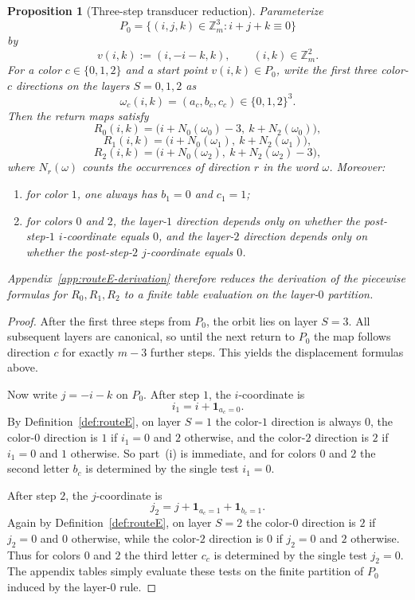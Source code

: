\documentclass[11pt]{article}
\newtheorem{proposition}{Proposition}
\begin{document}
\begin{proposition}[Three-step transducer reduction]\label{prop:routeE-transducer}
Parameterize
\[
P_0=\{(i,j,k)\in \mathbb Z_m^3:i+j+k\equiv 0\}
\]
by
\[
v(i,k):=(i,-i-k,k),\qquad (i,k)\in \mathbb Z_m^2.
\]
For a color $c\in\{0,1,2\}$ and a start point $v(i,k)\in P_0$, write the first three color-$c$ directions on the layers $S=0,1,2$ as
\[
\omega_c(i,k)=(a_c,b_c,c_c)\in\{0,1,2\}^3.
\]
Then the return maps satisfy
\[
R_0(i,k)=\bigl(i+N_0(\omega_0)-3,\ k+N_2(\omega_0)\bigr),
\]
\[
R_1(i,k)=\bigl(i+N_0(\omega_1),\ k+N_2(\omega_1)\bigr),
\]
\[
R_2(i,k)=\bigl(i+N_0(\omega_2),\ k+N_2(\omega_2)-3\bigr),
\]
where $N_r(\omega)$ counts the occurrences of direction $r$ in the word $\omega$.
Moreover:
\begin{enumerate}[label=\textup{(\roman*)},leftmargin=2.5em]
\item for color $1$, one always has $b_1=0$ and $c_1=1$;
\item for colors $0$ and $2$, the layer-$1$ direction depends only on whether the post-step-$1$ $i$-coordinate equals $0$, and the layer-$2$ direction depends only on whether the post-step-$2$ $j$-coordinate equals $0$.
\end{enumerate}
Appendix~\ref{app:routeE-derivation} therefore reduces the derivation of the piecewise formulas for $R_0,R_1,R_2$ to a finite table evaluation on the layer-$0$ partition.
\end{proposition}

\begin{proof}
After the first three steps from $P_0$, the orbit lies on layer $S=3$.
All subsequent layers are canonical, so until the next return to $P_0$ the map follows direction $c$ for exactly $m-3$ further steps.
This yields the displacement formulas above.

Now write $j=-i-k$ on $P_0$.
After step $1$, the $i$-coordinate is
\[
i_1=i+\mathbf 1_{a_c=0}.
\]
By Definition~\ref{def:routeE}, on layer $S=1$ the color-$1$ direction is always $0$, the color-$0$ direction is $1$ if $i_1=0$ and $2$ otherwise, and the color-$2$ direction is $2$ if $i_1=0$ and $1$ otherwise.
So part~\textup{(i)} is immediate, and for colors $0$ and $2$ the second letter $b_c$ is determined by the single test $i_1=0$.

After step $2$, the $j$-coordinate is
\[
j_2=j+\mathbf 1_{a_c=1}+\mathbf 1_{b_c=1}.
\]
Again by Definition~\ref{def:routeE}, on layer $S=2$ the color-$0$ direction is $2$ if $j_2=0$ and $0$ otherwise, while the color-$2$ direction is $0$ if $j_2=0$ and $2$ otherwise.
Thus for colors $0$ and $2$ the third letter $c_c$ is determined by the single test $j_2=0$.
The appendix tables simply evaluate these tests on the finite partition of $P_0$ induced by the layer-$0$ rule.
\end{proof}
\end{document}
